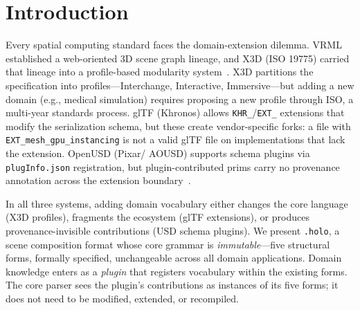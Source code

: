 \documentclass[sigconf,nonacm]{acmart}
\newcommand{\holo}{\texttt{.holo}}
\begin{document}

\maketitle

\section{Introduction}
\label{sec:intro}

Every spatial computing standard faces the domain-extension
dilemma. VRML established a web-oriented 3D scene graph lineage,
and X3D (ISO 19775) carried that lineage into a profile-based
modularity system~\cite{carey1997vrml,brutzman2008x3d}. X3D
partitions the specification into profiles---Interchange,
Interactive, Immersive---but adding a new domain (e.g., medical
simulation) requires proposing a new profile through ISO, a
multi-year standards process.
glTF (Khronos) allows \texttt{KHR\_}/\texttt{EXT\_}
extensions that modify the serialization schema, but these
create vendor-specific forks: a file with
\texttt{EXT\_mesh\_gpu\_instancing} is not a valid glTF file
on implementations that lack the extension. OpenUSD (Pixar/
AOUSD) supports schema plugins via \texttt{plugInfo.json}
registration, but plugin-contributed prims carry no
provenance annotation across the extension
boundary~\cite{aousd-core-spec-1.0}.

In all three systems, adding domain vocabulary either changes
the core language (X3D profiles), fragments the ecosystem
(glTF extensions), or produces provenance-invisible
contributions (USD schema plugins). We present \holo{}, a
scene composition format whose core grammar is
\emph{immutable}---five structural forms, formally specified,
unchangeable across all domain applications. Domain knowledge
enters as a \emph{plugin} that registers vocabulary within
the existing forms. The core parser sees the plugin's
contributions as instances of its five forms; it does not
need to be modified, extended, or recompiled.
\end{document}
